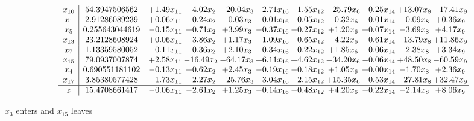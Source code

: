 \documentclass[9pt]{article}
\begin{document}
 \[\begin{array}{c| c c@{\hskip 2pt} c@{\hskip 2pt} c@{\hskip 2pt} c@{\hskip 2pt} c@{\hskip 2pt} c@{\hskip 2pt} c@{\hskip 2pt} c@{\hskip 2pt} c@{\hskip 2pt} }
 x_{10}   &  54.3947506562 & +  1.49 x_{11} & -4.02 x_{2} & -20.04 x_{3} & +  2.71 x_{16} & +  1.55 x_{12} & -25.79 x_{6} & +  0.25 x_{14} & + 13.07 x_{8} & -17.41 x_{9}\\
 x_{1}   &  2.91286089239 & +  0.06 x_{11} & -0.24 x_{2} & -0.03 x_{3} & +  0.01 x_{16} & -0.05 x_{12} & -0.32 x_{6} & +  0.01 x_{14} & -0.09 x_{8} & +  0.36 x_{9}\\
 x_{5}   &  0.255643044619 & -0.15 x_{11} & +  0.71 x_{2} & +  3.99 x_{3} & -0.37 x_{16} & -0.27 x_{12} & +  1.20 x_{6} & +  0.07 x_{14} & -3.69 x_{8} & +  4.17 x_{9}\\
 x_{13}   &  23.2128608924 & +  0.06 x_{11} & +  3.86 x_{2} & +  1.17 x_{3} & -1.09 x_{16} & -0.65 x_{12} & -4.22 x_{6} & +  0.61 x_{14} & -13.79 x_{8} & + 11.86 x_{9}\\
 x_{7}   &  1.13359580052 & -0.11 x_{11} & +  0.36 x_{2} & +  2.10 x_{3} & -0.34 x_{16} & -0.22 x_{12} & +  1.85 x_{6} & -0.06 x_{14} & -2.38 x_{8} & +  3.34 x_{9}\\
 x_{15}   &  79.0937007874 & +  2.58 x_{11} & -16.49 x_{2} & -64.17 x_{3} & +  6.11 x_{16} & +  4.62 x_{12} & -34.20 x_{6} & -0.06 x_{14} & + 48.50 x_{8} & -60.59 x_{9}\\
 x_{4}   &  0.690551181102 & -0.13 x_{11} & +  0.62 x_{2} & +  2.45 x_{3} & -0.19 x_{16} & -0.18 x_{12} & +  1.05 x_{6} & +  0.00 x_{14} & -1.70 x_{8} & +  2.36 x_{9}\\
 x_{17}   &  3.85380577428 & -1.73 x_{11} & +  2.27 x_{2} & + 25.76 x_{3} & -3.04 x_{16} & -2.15 x_{12} & + 15.35 x_{6} & +  0.53 x_{14} & -27.81 x_{8} & + 32.47 x_{9}\\
\hline
z    &  15.4708661417 & -0.06 x_{11} & -2.61 x_{2} & +  1.25 x_{3} & -0.14 x_{16} & -0.48 x_{12} & +  4.20 x_{6} & -0.22 x_{14} & -2.14 x_{8} & +  8.06 x_{9}\\
\end{array}\]


 $ x_{3} $ enters and $ x_{15} $ leaves 
\end{document}
